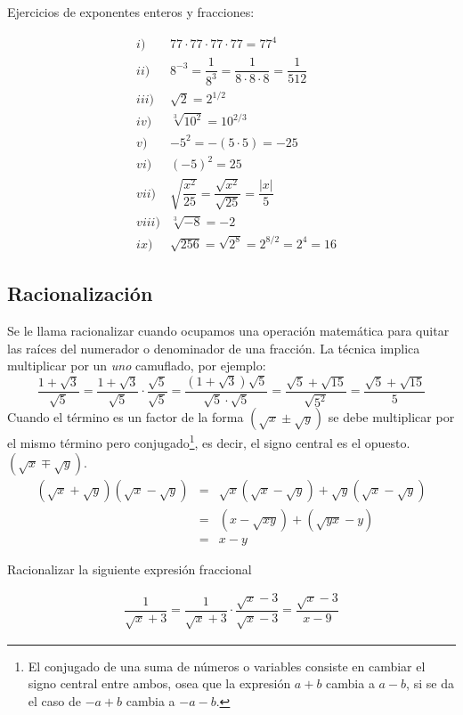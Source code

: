 \begin{myexample}
Ejercicios de exponentes enteros y fracciones:
\end{myexample}
\begin{eqnarray*}
&i)& 77\cdot 77 \cdot 77\cdot 77 =77^{4}\\
&ii)& 8^{-3}=\dfrac{1}{8^{3}}=\dfrac{1}{8\cdot 8\cdot 8}=\dfrac{1}{512}\\
&iii)& \sqrt{2}=2^{1/2}\\
&iv)& \sqrt[3]{10^{2}}=10^{2/3}\\
&v)& -5^{2}=-(5\cdot 5)=-25\\
&vi)& (-5)^{2}=25\\
&vii)& \sqrt{\dfrac{x^{2}}{25}}=\dfrac{\sqrt{x^{2}}}{\sqrt{25}}=\dfrac{|x|}{5}\\
&viii)& \sqrt[3]{-8}=-2\\
&ix)& \sqrt{256}=\sqrt{2^{8}}=2^{8/2}=2^{4}=16
\end{eqnarray*}

\subsection{Racionalización}
Se le llama racionalizar cuando ocupamos una operación matemática para quitar las raíces del numerador o denominador de una fracción. La técnica implica multiplicar por un \textit{uno} camuflado, por ejemplo:
\begin{equation*}
\dfrac{1+\sqrt{3}}{\sqrt{5}}=\dfrac{1+\sqrt{3}}{\sqrt{5}}\cdot\dfrac{\sqrt{5}}{\sqrt{5}}=\dfrac{(1+\sqrt{3})\sqrt{5}}{\sqrt{5}\cdot\sqrt{5}}=\dfrac{\sqrt{5}+\sqrt{15}}{\sqrt{5^{2}}}=\dfrac{\sqrt{5}+\sqrt{15}}{5}
\end{equation*}
Cuando el término es un factor de la forma $(\sqrt{x}\pm\sqrt{y})$ se debe multiplicar por el mismo término pero conjugado\footnote{El conjugado de una suma de números o variables consiste en cambiar el signo central entre ambos, osea que la expresión $a+b$ cambia a $a-b$, si se da el caso de $-a+b$ cambia a $-a-b$.}, es decir, el signo central es el opuesto.
$(\sqrt{x}\mp\sqrt{y})$.\\
\begin{eqnarray*}
(\sqrt{x}+\sqrt{y})(\sqrt{x}-\sqrt{y})&=& \sqrt{x}(\sqrt{x}-\sqrt{y})+\sqrt{y}(\sqrt{x}-\sqrt{y})\\
&=& (x-\sqrt{xy})+(\sqrt{yx}-y)\\
&=& x-y
\end{eqnarray*}

\begin{myexample}
Racionalizar la siguiente expresión fraccional
\end{myexample}
\begin{eqnarray*}
\dfrac{1}{\sqrt{x}+3}=\dfrac{1}{\sqrt{x}+3}\cdot \dfrac{\sqrt{x}-3}{\sqrt{x}-3}=\dfrac{\sqrt{x}-3}{x-9}
\end{eqnarray*}

